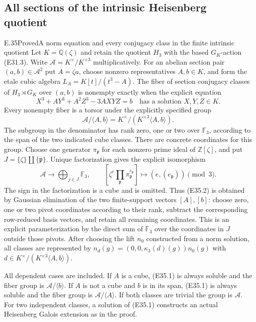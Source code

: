 \subsection{All sections of the intrinsic Heisenberg quotient}

\begin{statement}{E.35}{Proved}{A norm equation and every conjugacy class in the finite intrinsic quotient}
Let $K=\mathbb Q(\zeta)$ and retain the quotient $H_3$ with
the based $G_K$-action (E31.3).
Write $\mathcal A=K^\times/K^{\times3}$ multiplicatively.
For an abelian section pair $(a,b)\in\mathcal A^2$ put
$A=\zeta a$, choose nonzero representatives $A,b\in K$,
and form the etale cubic algebra
$L_A=K[t]/(t^3-A)$.
The fiber of section conjugacy classes of
$H_3\rtimes G_K$ over $(a,b)$ is nonempty exactly when
the explicit equation
\[
 X^3+A Y^3+A^2 Z^3-3AXYZ=b
                 \quad\text{has a solution }X,Y,Z\in K .
 \tag{E35.1}
\]
Every nonempty fiber is a torsor under the explicitly
specified group
\[
 \mathcal A/\langle A,b\rangle
       =K^\times/(K^{\times3}\langle A,b\rangle).
 \tag{E35.2}
\]
The subgroup in the denominator has rank zero, one or two
over $\mathbb F_3$, according to the span of the two
indicated cube classes.
There are concrete coordinates for this group. Choose one
generator $\pi_{\mathfrak p}$ for each nonzero prime ideal of
$\mathbb Z[\zeta]$, and put
$J=\{\zeta\}\amalg\{\mathfrak p\}$.
Unique factorization gives the explicit isomorphism
\[
 \mathcal A\longrightarrow\bigoplus_{j\in J}\mathbb F_3,
 \qquad
 [\zeta^e\prod_{\mathfrak p}\pi_{\mathfrak p}^{e_{\mathfrak p}}]
       \longmapsto(e,(e_{\mathfrak p}))\pmod3 .
 \tag{E35.2a}
\]
The sign in the factorization is a cube and is omitted.
Thus (E35.2) is obtained by Gaussian elimination of the
two finite-support vectors $[A],[b]$: choose zero, one or
two pivot coordinates according to their rank, subtract
the corresponding row-reduced basis vectors, and retain
all remaining coordinates. This is an explicit
parameterization by the direct sum of $\mathbb F_3$ over
the coordinates in $J$ outside those pivots.
After choosing the lift $n_0$ constructed from a norm solution,
all classes are represented by
$n_d(g)=(0,0,\kappa_3(d)(g))n_0(g)$ with
$d\in K^\times/(K^{\times3}\langle A,b\rangle)$.

All dependent cases are included. If $A$ is a cube,
(E35.1) is always soluble and the fiber group is
$\mathcal A/\langle b\rangle$.
If $A$ is not a cube and $b$ is in its span, (E35.1) is
always soluble and the fiber group is
$\mathcal A/\langle A\rangle$.
If both classes are trivial the group is $\mathcal A$.
For two independent classes, a solution of (E35.1)
constructs an actual Heisenberg Galois extension as in the proof.


\end{statement}
